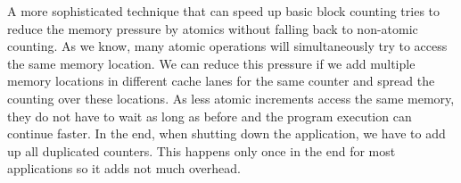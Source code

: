 A more sophisticated technique that can speed up basic block counting tries to reduce the memory pressure by atomics without falling back to non-atomic counting. As we know, many atomic operations will simultaneously try to access the same memory location.
We can reduce this pressure if we add multiple memory locations in different cache lanes for the same counter and spread the counting over these locations. As less atomic increments access the same memory, they do not have to wait as long as before and the program execution can continue faster.
In the end, when shutting down the application, we have to add up all duplicated counters. This happens only once in the end for most applications so it adds not much overhead.
